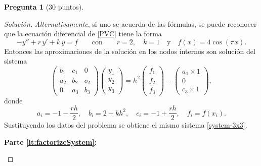\documentclass[letterpaper,12pt]{article}
\theoremstyle{definition}
\newtheorem{question}{Pregunta}
\numberwithin{equation}{question}
\newenvironment{solution}{\begin{proof}[Solución]}{\end{proof}}
\begin{document}
\begin{question}[30 puntos]
\begin{solution}
\emph{Alternativamente}, si uno se acuerda de las fórmulas, se puede reconocer que la ecuación diferencial de \eqref{PVC} tiene la forma
%
\begin{equation*}
-y'' + r \, y' + k \, y = f
\qquad\text{con}\qquad
r = 2, \quad k = 1 \quad\text{y}\quad f(x) = 4 \cos(\pi x).
\end{equation*}
%
Entonces las aproximaciones de la solución en los nodos internos son solución del sistema
%
\begin{equation*}
\begin{pmatrix}
b_1 & c_1 & 0\\
a_2 & b_2 & c_2\\
0 & a_3 & b_3
\end{pmatrix}
\begin{pmatrix} y_1 \\ y_2 \\ y_3 \end{pmatrix}
= h^2 \begin{pmatrix} f_1 \\ f_2 \\ f_3 \end{pmatrix}
- \begin{pmatrix} a_1 \times 1 \\ 0 \\ c_3 \times 1 \end{pmatrix},
\end{equation*}
%
donde
%
\begin{equation*}
a_i = -1 - \frac{r h}{2}, \quad
b_i = 2 + k h^2, \quad
c_i = -1 + \frac{r h}{2}, \quad
f_i = f(x_i).
\end{equation*}
%
Sustituyendo los datos del problema se obtiene el mismo sistema \eqref{system-3x3}.

\medskip

\textbf{Parte \ref{it:factorizeSystem}:}

\begin{center}\end{center}


\end{solution}
\end{question}
\end{document}
